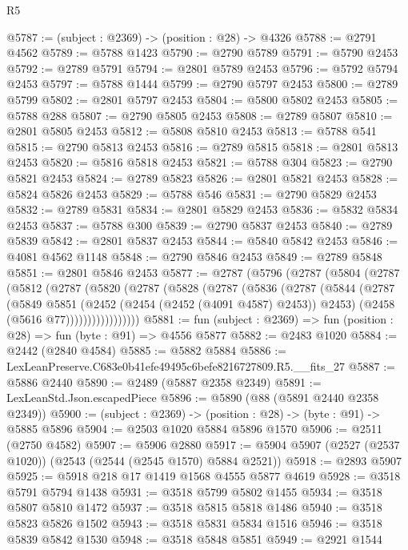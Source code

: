\begin{lexlean}{R5}
\begin{coremodule}
@5787 := (subject : @2369) -> (position : @28) -> @4326
@5788 := @2791 @4562
@5789 := @5788 @1423
@5790 := @2790 @5789
@5791 := @5790 @2453
@5792 := @2789 @5791
@5794 := @2801 @5789 @2453
@5796 := @5792 @5794 @2453
@5797 := @5788 @1444
@5799 := @2790 @5797 @2453
@5800 := @2789 @5799
@5802 := @2801 @5797 @2453
@5804 := @5800 @5802 @2453
@5805 := @5788 @288
@5807 := @2790 @5805 @2453
@5808 := @2789 @5807
@5810 := @2801 @5805 @2453
@5812 := @5808 @5810 @2453
@5813 := @5788 @541
@5815 := @2790 @5813 @2453
@5816 := @2789 @5815
@5818 := @2801 @5813 @2453
@5820 := @5816 @5818 @2453
@5821 := @5788 @304
@5823 := @2790 @5821 @2453
@5824 := @2789 @5823
@5826 := @2801 @5821 @2453
@5828 := @5824 @5826 @2453
@5829 := @5788 @546
@5831 := @2790 @5829 @2453
@5832 := @2789 @5831
@5834 := @2801 @5829 @2453
@5836 := @5832 @5834 @2453
@5837 := @5788 @300
@5839 := @2790 @5837 @2453
@5840 := @2789 @5839
@5842 := @2801 @5837 @2453
@5844 := @5840 @5842 @2453
@5846 := @4081 @4562 @1148
@5848 := @2790 @5846 @2453
@5849 := @2789 @5848
@5851 := @2801 @5846 @2453
@5877 := @2787
    (@5796
      (@2787
        (@5804
          (@2787
            (@5812
              (@2787
                (@5820
                  (@2787
                    (@5828
                      (@2787
                        (@5836
                          (@2787
                            (@5844
                              (@2787
                                (@5849
                                  @5851
                                  (@2452 (@2454 (@2452 (@4091 @4587) @2453)) @2453)
                                  (@2458 (@5616 @77)))))))))))))))))
@5881 := fun (subject : @2369) => fun (position : @28) => fun (byte : @91) => @4556 @5877
@5882 := @2483 @1020
@5884 := @2442 (@2840 @4584)
@5885 := @5882 @5884
@5886 := LexLeanPreserve.C683e0b41efe49495c6befe8216727809.R5.__fits_27
@5887 := @5886 @2440
@5890 := @2489 (@5887 @2358 @2349)
@5891 := LexLeanStd.Json.escapedPiece
@5896 := @5890 (@88 (@5891 @2440 @2358 @2349))
@5900 := (subject : @2369) -> (position : @28) -> (byte : @91) -> @5885 @5896
@5904 := @2503 @1020 @5884 @5896 @1570
@5906 := @2511 (@2750 @4582)
@5907 := @5906 @2880
@5917 := @5904 @5907 (@2527 (@2537 @1020)) (@2543 (@2544 (@2545 @1570) @5884 @2521))
@5918 := @2893 @5907
@5925 := @5918 @218 @17 @1419 @1568 @4555 @5877 @4619
@5928 := @3518 @5791 @5794 @1438
@5931 := @3518 @5799 @5802 @1455
@5934 := @3518 @5807 @5810 @1472
@5937 := @3518 @5815 @5818 @1486
@5940 := @3518 @5823 @5826 @1502
@5943 := @3518 @5831 @5834 @1516
@5946 := @3518 @5839 @5842 @1530
@5948 := @3518 @5848 @5851
@5949 := @2921 @1544

\end{coremodule}
\end{lexlean}
